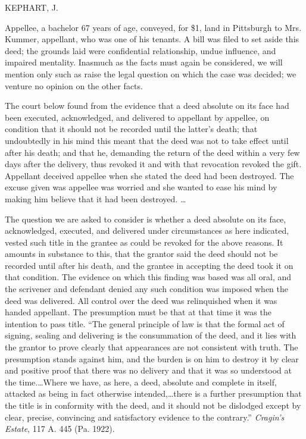 
KEPHART, J.

Appellee, a bachelor 67 years of age, conveyed, for \$1, land in Pittsburgh to
Mrs. Kummer, appellant, who was one of his tenants. A bill was filed to set
aside this deed; the grounds laid were confidential relationship, undue
influence, and impaired mentality. Inasmuch as the facts must again be
considered, we will mention only such as raise the legal question on which the
case was decided; we venture no opinion on the other facts.

The court below found from the evidence that a deed absolute on its face had
been executed, acknowledged, and delivered to appellant by appellee, on
condition that it should not be recorded until the latter's death; that
undoubtedly in his mind this meant that the deed was not to take effect until
after his death; and that he, demanding the return of the deed within a very
few days after the delivery, thus revoked it and with that revocation revoked
the gift. Appellant deceived appellee when she stated the deed had been
destroyed. The excuse given was appellee was worried and she wanted to ease his
mind by making him believe that it had been destroyed. \dots{}

The question we are asked to consider is whether a deed absolute on its face,
acknowledged, executed, and delivered under circumstances as here indicated,
vested such title in the grantee as could be revoked for the above reasons. It
amounts in substance to this, that the grantor said the deed should not be
recorded until after his death, and the grantee in accepting the deed took it
on that condition. The evidence on which this finding was based was all oral,
and the scrivener and defendant denied any such condition was imposed when the
deed was delivered. All control over the deed was relinquished when it was
handed appellant. The presumption must be that at that time it was the
intention to pass title. ``The general principle of law is that the formal act
of signing, sealing and delivering is the consummation of the deed, and it lies
with the grantor to prove clearly that appearances are not consistent with
truth. The presumption stands against him, and the burden is on him to destroy
it by clear and positive proof that there was no delivery and that it was so
understood at the time.\dots Where we have, as here, a deed, absolute and
complete in itself, attacked as being in fact otherwise intended,\dots there
is a further presumption that the title is in conformity with the deed, and it
should not be dislodged except by clear, precise, convincing and satisfactory
evidence to the contrary.'' \textit{Cragin's Estate}, 117 A. 445 (Pa. 1922).

